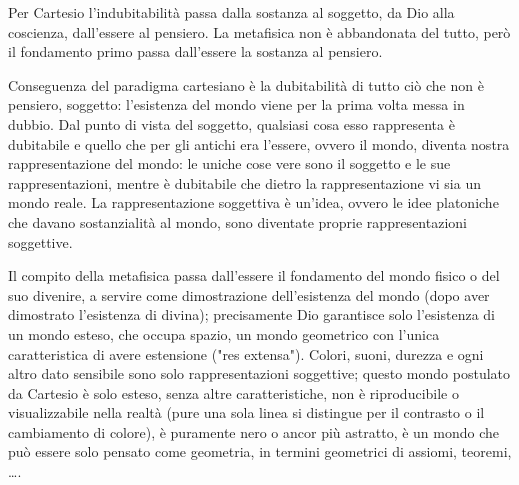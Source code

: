 \documentclass[a4paper,12pt,oneside]{article}%
\begin{document}
Per Cartesio l'indubitabilità passa dalla sostanza al soggetto, da Dio alla coscienza, dall'essere al pensiero. La metafisica non è abbandonata del tutto, però il fondamento primo passa dall'essere la sostanza al pensiero.

Conseguenza del paradigma cartesiano è la dubitabilità di tutto ciò che non è pensiero, soggetto: l'esistenza del mondo viene per la prima volta messa in dubbio. Dal punto di vista del soggetto, qualsiasi cosa esso rappresenta è dubitabile e quello che per gli antichi era l'essere, ovvero il mondo, diventa nostra rappresentazione del mondo: le uniche cose vere sono il soggetto e le sue rappresentazioni, mentre è dubitabile che dietro la rappresentazione vi sia un mondo reale. La rappresentazione soggettiva è un'idea, ovvero le idee platoniche che davano sostanzialità al mondo, sono diventate proprie rappresentazioni soggettive.

Il compito della metafisica passa dall'essere il fondamento del mondo fisico o del suo divenire, a servire come dimostrazione dell'esistenza del mondo (dopo aver dimostrato l'esistenza di divina); precisamente Dio garantisce solo l'esistenza di un mondo esteso, che occupa spazio, un mondo geometrico con l'unica caratteristica di avere estensione ("res extensa"). Colori, suoni, durezza e ogni altro dato sensibile sono solo rappresentazioni soggettive; questo mondo postulato da Cartesio è solo esteso, senza altre caratteristiche, non è riproducibile o visualizzabile nella realtà (pure una sola linea si distingue per il contrasto o il cambiamento di colore), è puramente nero o ancor più astratto, è un mondo che può essere solo pensato come geometria, in termini geometrici di assiomi, teoremi, \dots.


	
\end{document}
